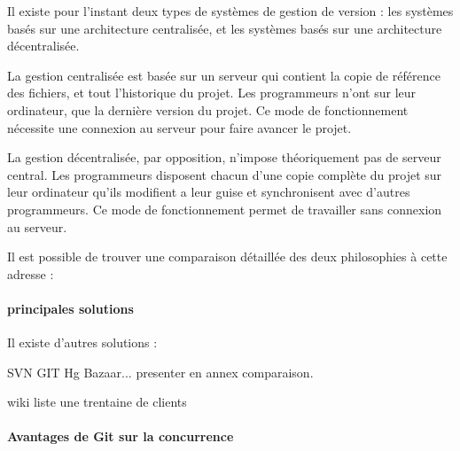 Il existe pour l'instant deux types de systèmes de gestion de version : 
les systèmes basés sur une architecture centralisée,
et les systèmes basés sur une architecture décentralisée.

La gestion centralisée est basée sur un serveur qui contient la copie de référence des fichiers, 
et tout l'historique du projet. 
Les programmeurs n'ont sur leur ordinateur, que la dernière version du projet. 
Ce mode de fonctionnement nécessite une connexion au serveur pour faire avancer le projet.

La gestion décentralisée, par opposition, n'impose théoriquement pas de serveur central.
Les programmeurs disposent chacun d'une copie complète du projet sur leur ordinateur
qu'ils modifient a leur guise et synchronisent avec d'autres programmeurs.
Ce mode de fonctionnement permet de travailler sans connexion au serveur.

Il est possible de trouver une comparaison détaillée des deux philosophies à cette adresse :

\paragraph{principales solutions}

Il existe d'autres solutions :


SVN GIT Hg Bazaar...
presenter en annex comparaison.

wiki liste une trentaine de clients



\paragraph{Avantages de Git sur la concurrence}

